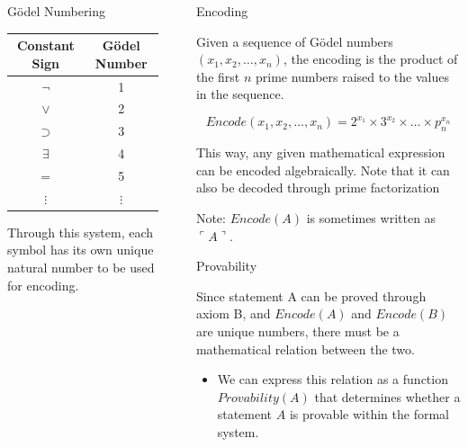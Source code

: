 \documentclass[final]{beamer} %
\newlength{\sepwidth}
\newlength{\colwidth}
\newcommand{\separatorcolumn}{\begin{column}{\sepwidth}\end{column}}
\begin{document}
\begin{frame}[t]
\begin{columns}[t]
\begin{column}{\colwidth}
\begin{block}{Gödel Numbering}
    \begin{table}[h]
    \centering
    \begin{tabular}{c|c}
    \textbf{Constant Sign} & \textbf{Gödel Number} \\ \hline
    $\neg$ & 1 \\ 
    $\lor$ & 2 \\ 
    $\supset$ & 3 \\ 
    $\exists$ & 4 \\ 
    $=$ & 5 \\ 
    $\vdots$ & $\vdots$ \\ 
    \end{tabular}
    \end{table}

    Through this system, each symbol has its own unique natural number to be used for encoding.
    
  \end{block}

\end{column}

\separatorcolumn %

\begin{column}{\colwidth}

  \begin{block}{Encoding}

    Given a sequence of Gödel numbers $(x_1, x_2, \dots, x_n)$, the encoding is the product of the first $n$ prime numbers raised to the values in the sequence.

    $$Encode(x_1, x_2, \dots, x_n) = 2^{x_1} \times 3^{x_2} \times \ldots \times p_n^{x_n}$$

    This way, any given mathematical expression can be encoded algebraically. Note that it can also be decoded through prime factorization

    Note: $Encode(A)$ is sometimes written as $\ulcorner A \urcorner$.

  \end{block}

 \begin{block}{Provability}

Since statement A can be proved through axiom B, and $Encode(A)$ and $Encode(B)$ are unique numbers, there must be a mathematical relation between the two.

 \begin{itemize}
    
    \item We can express this relation as a function $Provability(A)$ that determines whether a statement $A$ is provable within the formal system.
    

\end{itemize}
\end{block}
\end{column}
\end{columns}
\end{frame}
\end{document}
